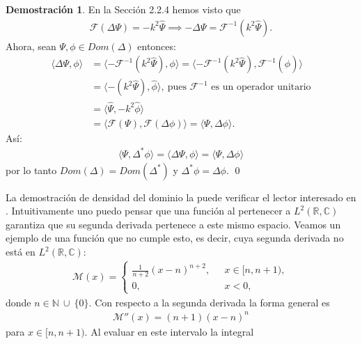 \documentclass[12pt]{article}
\theoremstyle{definition}
\newtheorem*{demo}{Demostración}
\newcommand*{\field}[1]{\mathbb{#1}}
\begin{document}
\begin{demo}
    En la Sección 2.2.4 hemos visto que
    \begin{align*}
        \mathcal{F}(\Delta\Psi) = -k^2\hat{\Psi}
        \implies
        -\Delta\Psi = \mathcal{F}^{-1}(k^2\hat{\Psi}).
    \end{align*}
    Ahora, sean $\Psi,\phi \in Dom(\Delta)$ entonces:
    \begin{align*}   \langle\Delta\Psi,\phi\rangle & = 
        \langle -\mathcal{F}^{-1}(k^2\hat{\Psi}),\phi\rangle =
        \langle -\mathcal{F}^{-1}(k^2\hat{\Psi}), \mathcal{F}^{-1}(\hat{\phi})\rangle \\
        & =
        \langle -(k^2\hat{\Psi}),\hat{\phi}\rangle,\:\text{pues $\mathcal{F}^{-1}$ es un operador unitario}  \\
        & =
        \langle \hat{\Psi}, -k^2\hat{\phi}\rangle \\
        & =
        \langle \mathcal{F}(\Psi),\mathcal{F}(\Delta\phi)\rangle =
        \langle \Psi, \Delta \phi \rangle.
    \end{align*}
    Así:
    \begin{align*} \langle\Psi,\Delta^*\phi\rangle =
        \langle\Delta\Psi,\phi\rangle =
        \langle\Psi,\Delta\phi\rangle
    \end{align*}
    por lo tanto $Dom(\Delta) =Dom(\Delta^*)$ y $\Delta^*\phi = \Delta\phi$.
    \qed
\end{demo}
\noindent
    La demostración de densidad del dominio la puede verificar el lector interesado  en  \cite[ ]{Iorio}. Intuitivamente uno puedo pensar que una función al pertenecer a $L^2(\field{R},\field{C})$ garantiza que su segunda derivada pertenece a este mismo espacio. Veamos un ejemplo de una función que no cumple esto, es decir, cuya segunda derivada no está en $L^2(\field{R},\field{C})$:
    \begin{align*}
         \mathcal{M}(x) =
        \left\{ \begin{array}{ll}
        \frac{1}{n+2}(x-n)^{n+2},& \:\:\:  x\in[n,n+1),
        \\
        0,& \:\:\: x < 0,
        \end{array}
        \right.
\end{align*}    
donde $n\in\field{N}\:\cup\:\{0\}$. Con respecto a la segunda derivada la forma general es 
\begin{align*}
    \mathcal{M}''(x)=
    (n+1)(x-n)^{n}
\end{align*}
para $x\in[n,n+1)$. Al evaluar en este intervalo la integral
\end{document}
